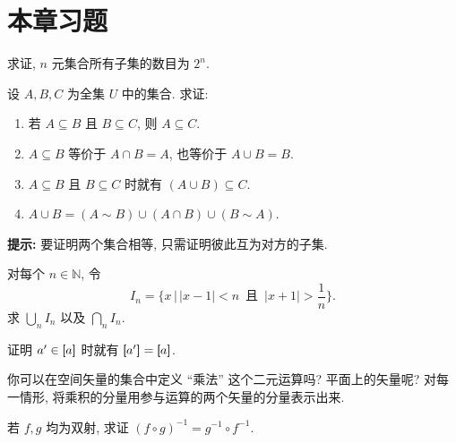 \documentclass[lang=cn,zihao=-4,twoside,fontset=none]{textbook}
\newcommand{\lt}{<}
\newcommand{\gt}{>}
\newcommand{\equivclass}[1]{\left[\hspace{-3pt}\left[#1\right]\hspace{-2.5pt}\right]}
\newcommand{\bigmid}{\,\bigg|\,}
\begin{document}
\section{本章习题}

\begin{problem}\label{ex:1.1}
    求证, $n$ 元集合所有子集的数目为 $2^n$.
\end{problem}

\begin{problem}\label{ex:1.2}
    设 $A,B,C$ 为全集 $U$ 中的集合. 求证:
    \begin{enumerate}[label=\textnormal{(\alph*)}]
        \item 若 $A\subseteq B$ 且 $B\subseteq C$, 则 $A\subseteq C$.
        \item $A\subseteq B$ 等价于 $A\cap B=A$, 也等价于 $A\cup B=B$.
        \item $A\subseteq B$ 且 $B\subseteq C$ 时就有 $(A\cup B)\subseteq C$.
        \item $A\cup B=(A\sim B)\cup(A\cap B)\cup(B\sim A)$.
    \end{enumerate}
    \textbf{提示:} 要证明两个集合相等, 只需证明彼此互为对方的子集.
\end{problem}

\begin{problem}\label{ex:1.3}
    对每个 $n\in\mathbb N$, 令
    $$
    I_n=\bigg\{ x\bigmid |x-1|\lt n \, \text{ 且 } \, |x+1|\gt\frac{1}{n} \bigg\}.
    $$
    求 $\bigcup_nI_n$ 以及 $\bigcap_nI_n$.
\end{problem}

\begin{problem}\label{ex:1.4}
    证明 $a'\in\equivclass{a}$ 时就有 $\equivclass{a'}=\equivclass{a}$.
\end{problem}

\begin{problem}\label{ex:1.5}
    你可以在空间矢量的集合中定义 “乘法” 这个二元运算吗? 平面上的矢量呢? 对每一情形, 将乘积的分量用参与运算的两个矢量的分量表示出来.
\end{problem}

\begin{problem}\label{ex:1.6}
    若 $f,g$ 均为双射, 求证 $(f\circ g)^{-1}=g^{-1}\circ f^{-1}$.
\end{problem}
\end{document}
